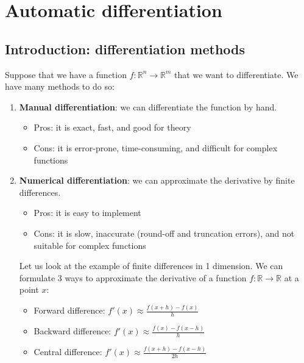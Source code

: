 \chapter{Automatic differentiation}

\section{Introduction: differentiation methods}

Suppose that we have a function $f: \mathbb{R}^n \to \mathbb{R}^m$ that we want to differentiate.
We have many methods to do so:

\begin{enumerate}
    \item \textbf{Manual differentiation}: we can differentiate the function by hand.

    \begin{itemize}
        \item Pros: it is exact, fast, and good for theory
        \item Cons: it is error-prone, time-consuming, and difficult for complex functions
    \end{itemize}

    \item \textbf{Numerical differentiation}: we can approximate the derivative by finite differences.
    
    \begin{itemize}
        \item Pros: it is easy to implement
        \item Cons: it is slow, inaccurate (round-off and truncation errors), and not suitable for complex functions
    \end{itemize}

    Let us look at the example of finite differences in 1 dimension. We can formulate 3 ways to 
    approximate the derivative of a function $f: \mathbb{R} \to \mathbb{R}$ at a point $x$:

    \begin{itemize}
        \item Forward difference: $f'(x) \approx \frac{f(x + h) - f(x)}{h}$
        \item Backward difference: $f'(x) \approx \frac{f(x) - f(x - h)}{h}$
        \item Central difference: $f'(x) \approx \frac{f(x + h) - f(x - h)}{2h}$
    \end{itemize}


\end{enumerate}

